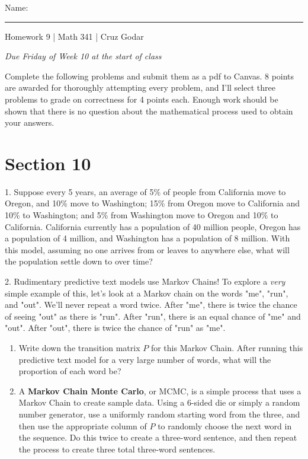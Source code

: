 \documentclass{article}
\begin{document}
\Large Name: \rule{2in}{0.15mm} \hfill Homework 9 | Math 341 | Cruz Godar \vspace{4pt}  \normalsize

\textit{Due Friday of Week 10 at the start of class}

Complete the following problems and submit them as a pdf to Canvas. 8 points are awarded for thoroughly attempting every problem, and I'll select three problems to grade on correctness for 4 points each. Enough work should be shown that there is no question about the mathematical process used to obtain your answers.

\section{Section 10}

1. Suppose every 5 years, an average of 5\% of people from California move to Oregon, and 10\% move to Washington; 15\% from Oregon move to California and 10\% to Washington; and 5\% from Washington move to Oregon and 10\% to California. California currently has a population of 40 million people, Oregon has a population of 4 million, and Washington has a population of 8 million. With this model, assuming no one arrives from or leaves to anywhere else, what will the population settle down to over time?

2. Rudimentary predictive text models use Markov Chains! To explore a \textit{very} simple example of this, let's look at a Markov chain on the words "me", "run", and "out". We'll never repeat a word twice. After "me", there is twice the chance of seeing "out" as there is "run". After "run", there is an equal chance of "me" and "out". After "out", there is twice the chance of "run" as "me".

\begin{enumerate}

	\item Write down the transition matrix $P$ for this Markov Chain. After running this predictive text model for a very large number of words, what will the proportion of each word be?

	\item A \textbf{Markov Chain Monte Carlo}, or MCMC, is a simple process that uses a Markov Chain to create sample data. Using a 6-sided die or simply a random number generator, use a uniformly random starting word from the three, and then use the appropriate column of $P$ to randomly choose the next word in the sequence. Do this twice to create a three-word sentence, and then repeat the process to create three total three-word sentences.

\end{enumerate}
\end{document}
